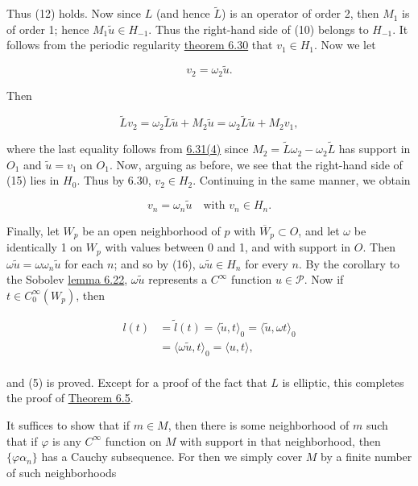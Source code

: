 Thus (12) holds. Now since $L$ (and hence $\tilde{L}$) is an operator of order 2, then $M_1$ is of order 1; hence $M_1\tilde{u} \in H_{-1}$. Thus the right-hand side of (10) belongs to $H_{-1}$. It follows from the periodic regularity \hyperref[thm:6.30]{theorem 6.30} that $v_1 \in H_1$. Now we let

\begin{equation}
\tag{14}\label{eq:6.32:14}
v_{2}=\omega_{2}\tilde{u}.
\end{equation}

Then

\begin{equation}
\tag{15}\label{eq:6.32:15}
\tilde{L}v_{2}=\omega_{2}\tilde{L}\tilde{u}+M_{2}\tilde{u}=\omega_{2}\tilde{L}\tilde{u}+M_{2}v_{1},
\end{equation}

where the last equality follows from \hyperref[thm:6.31]{6.31(4)} since  $ M_2 = \tilde{L}\omega_2 - \omega_2\tilde{L} $ has support in  $ O_1 $ and  $ \tilde{u} = v_1 $ on  $ O_1 $. Now, arguing as before, we see that the right-hand side of (15) lies in  $ H_0 $. Thus by 6.30,  $ v_2 \in H_2 $. Continuing in the same manner, we obtain

\begin{equation}
\tag{16}\label{eq:6.32:16}
v_{n}=\omega_{n}\tilde{u}\quad\text{with }v_{n}\in H_{n}.
\end{equation}

Finally, let $W_p$ be an open neighborhood of $p$ with $\overline{W}_p \subset O$, and let $\omega$ be identically 1 on $W_p$ with values between 0 and 1, and with support in $O$. Then $\omega\tilde{u} = \omega\omega_n\tilde{u}$ for each $n$; and so by (16), $\omega\tilde{u} \in H_n$ for every $n$. By the corollary to the Sobolev \hyperref[thm:6.22]{lemma 6.22}, $\omega\tilde{u}$ represents a $C^\infty$ function $u \in \mathcal{P}$. Now if $t \in C_0^\infty(W_p)$, then 

\[
\begin{aligned}{l(t)}&{{}=\tilde{l}(t)=\langle\tilde{u},t\rangle_{0}=\langle\tilde{u},\omega t\rangle_{0}}\\ {}&{{}=\langle\omega\tilde{u},t\rangle_{0}=\langle u,t\rangle,}\\ \end{aligned}
\]

and (5) is proved. Except for a proof of the fact that $L$ is elliptic, this completes the proof of \hyperref[thm:6.5]{Theorem 6.5}.

\label{thm:6.33} It suffices to show that if $m \in M$, then there is some neighborhood of $m$ such that if $\varphi$ is any $C^\infty$ function on $M$ with support in that neighborhood, then $\{\varphi\alpha_n\}$ has a Cauchy subsequence. For then we simply cover $M$ by a finite number of such neighborhoods

